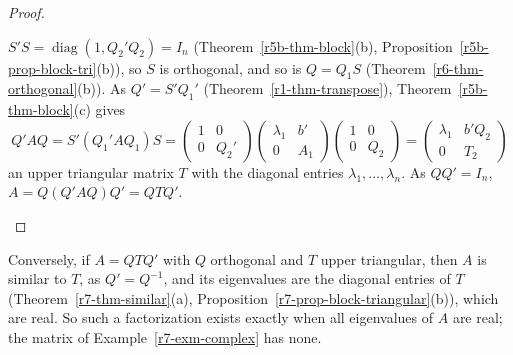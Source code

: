 \documentclass[12pt]{article}
\DeclareMathOperator{\diag}{diag}
\theoremstyle{definition}
\begin{document}
\begin{proof}
\begin{itemize}
\(S'S=\diag(1,Q_2'Q_2)=I_n\) (Theorem~\ref{r5b-thm-block}(b), Proposition~\ref{r5b-prop-block-tri}(b)), so \(S\) is
orthogonal, and so is \(Q=Q_1S\) (Theorem~\ref{r6-thm-orthogonal}(b)). As \(Q'=S'Q_1'\)
(Theorem~\ref{r1-thm-transpose}), Theorem~\ref{r5b-thm-block}(c) gives
\[
Q'AQ=S'(Q_1'AQ_1)S=\begin{pmatrix}1&0\\0&Q_2'\end{pmatrix}\begin{pmatrix}\lambda_1&b'\\0&A_1\end{pmatrix}
\begin{pmatrix}1&0\\0&Q_2\end{pmatrix}=\begin{pmatrix}\lambda_1&b'Q_2\\0&T_2\end{pmatrix}
\]
an upper triangular matrix \(T\) with the diagonal entries \(\lambda_1,\dots,\lambda_n\). As \(QQ'=I_n\),
\(A=Q(Q'AQ)Q'=QTQ'\).\qedhere
\end{itemize}
\end{proof}
Conversely, if \(A=QTQ'\) with \(Q\) orthogonal and \(T\) upper triangular, then \(A\) is similar to \(T\), as
\(Q'=Q^{-1}\), and its eigenvalues are the diagonal entries of \(T\) (Theorem~\ref{r7-thm-similar}(a),
Proposition~\ref{r7-prop-block-triangular}(b)), which are real. So such a factorization exists exactly when all
eigenvalues of \(A\) are real; the matrix of Example~\ref{r7-exm-complex} has none.
\end{document}
